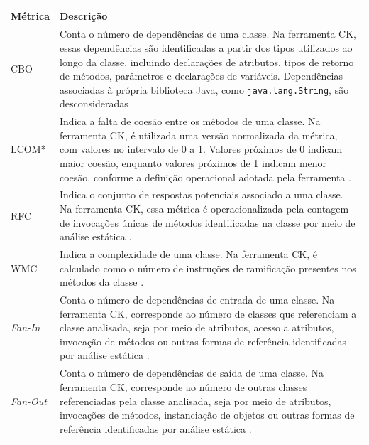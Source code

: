 \begin{quadro}[H]
\centering
\caption{Métricas utilizadas na avaliação da modularidade estrutural dos sistemas}
\label{quad:metricas}
\begin{tabular}{|p{2cm}|p{10cm}|}
\hline
\textbf{Métrica} & \textbf{Descrição} \\ \hline

CBO &
Conta o número de dependências de uma classe. Na ferramenta CK, essas dependências são identificadas a partir dos tipos 
utilizados ao longo da classe, incluindo declarações de atributos, tipos de retorno de métodos, parâmetros e declarações
de variáveis. Dependências associadas à própria biblioteca Java, como \texttt{java.lang.String}, são desconsideradas
\cite{aniche-ck}. \\ \hline

LCOM* &
Indica a falta de coesão entre os métodos de uma classe. Na ferramenta CK, é utilizada uma versão normalizada da métrica, 
com valores no intervalo de 0 a 1. Valores próximos de 0 indicam maior coesão, enquanto valores próximos de 1 indicam menor 
coesão, conforme a definição operacional adotada pela ferramenta \cite{aniche-ck}. \\ \hline

RFC &
Indica o conjunto de respostas potenciais associado a uma classe. Na ferramenta CK, essa métrica é operacionalizada 
pela contagem de invocações únicas de métodos identificadas na classe por meio de análise estática \cite{aniche-ck}. \\ \hline

WMC &
Indica a complexidade de uma classe. Na ferramenta CK, é calculado como o número de instruções de ramificação presentes nos 
métodos da classe \cite{aniche-ck}. \\ \hline

\textit{Fan-In} &
Conta o número de dependências de entrada de uma classe. Na ferramenta CK, corresponde ao número de classes que referenciam 
a classe analisada, seja por meio de atributos, acesso a atributos, invocação de métodos ou outras formas de referência 
identificadas por análise estática \cite{aniche-ck}. \\ \hline

\textit{Fan-Out} &
Conta o número de dependências de saída de uma classe. Na ferramenta CK, corresponde ao número de outras classes referenciadas
pela classe analisada, seja por meio de atributos, invocações de métodos, instanciação de objetos ou outras formas de 
referência identificadas por análise estática \cite{aniche-ck}. \\ \hline

\end{tabular}

\vspace{0.1cm}
\par
{}
\end{quadro}

